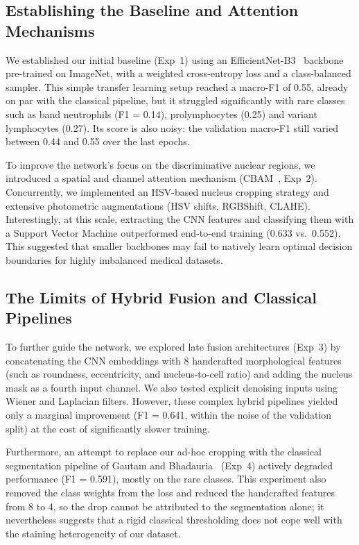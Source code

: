 \documentclass[twocolumn,a4paper]{article}
\begin{document}
\subsection{Establishing the Baseline and Attention Mechanisms}

We established our initial baseline (Exp~1) using an EfficientNet-B3~\cite{tan2019efficientnet} backbone pre-trained on ImageNet, with a weighted cross-entropy loss and a class-balanced sampler. This simple transfer learning setup reached a macro-F1 of 0.55, already on par with the classical pipeline, but it struggled significantly with rare classes such as band neutrophils (F1 = 0.14), prolymphocytes (0.25) and variant lymphocytes (0.27). Its score is also noisy: the validation macro-F1 still varied between 0.44 and 0.55 over the last epochs.

To improve the network's focus on the discriminative nuclear regions, we introduced a spatial and channel attention mechanism (CBAM~\cite{woo2018cbam}, Exp~2). Concurrently, we implemented an HSV-based nucleus cropping strategy and extensive photometric augmentations (HSV shifts, RGBShift, CLAHE). Interestingly, at this scale, extracting the CNN features and classifying them with a Support Vector Machine outperformed end-to-end training (0.633 vs.\ 0.552). This suggested that smaller backbones may fail to natively learn optimal decision boundaries for highly imbalanced medical datasets.

\subsection{The Limits of Hybrid Fusion and Classical Pipelines}

To further guide the network, we explored late fusion architectures (Exp~3) by concatenating the CNN embeddings with 8 handcrafted morphological features (such as roundness, eccentricity, and nucleus-to-cell ratio) and adding the nucleus mask as a fourth input channel. We also tested explicit denoising inputs using Wiener and Laplacian filters. However, these complex hybrid pipelines yielded only a marginal improvement (F1 = 0.641, within the noise of the validation split) at the cost of significantly slower training.

Furthermore, an attempt to replace our ad-hoc cropping with the classical segmentation pipeline of Gautam and Bhadauria~\cite{gautam2014} (Exp~4) actively degraded performance (F1 = 0.591), mostly on the rare classes. This experiment also removed the class weights from the loss and reduced the handcrafted features from 8 to 4, so the drop cannot be attributed to the segmentation alone; it nevertheless suggests that a rigid classical thresholding does not cope well with the staining heterogeneity of our dataset.
\end{document}
